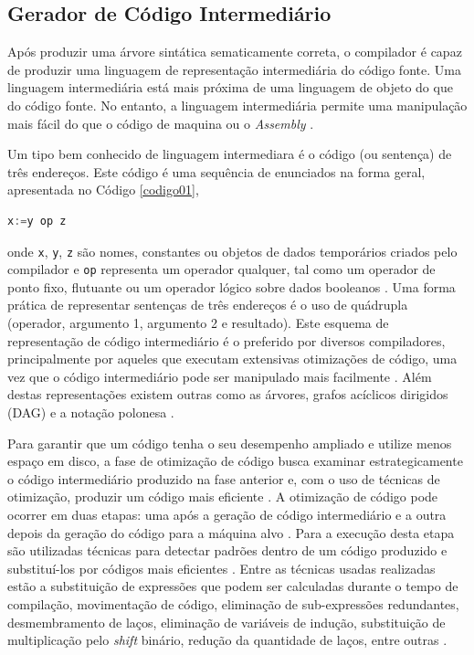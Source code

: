 \subsection{Gerador de Código Intermediário}

Após produzir uma árvore sintática sematicamente correta, o compilador é capaz de
 produzir uma linguagem de representação intermediária do código fonte. Uma linguagem 
intermediária está mais próxima de uma linguagem de objeto do que do código fonte. 
No entanto, a linguagem  intermediária permite uma manipulação mais fácil do que o 
código de maquina ou o \textit{Assembly} \cite{ref25}. 

Um tipo bem conhecido de linguagem intermediara é o código (ou sentença) de três 
endereços\cite{ref26}. Este código é uma sequência de enunciados na forma geral, apresentada 
 no Código \ref{codigo01},

\begin{lstlisting}[language=C++,caption={Código de três endereços},
											label=codigo01]
   x:=y op z
\end{lstlisting}
onde \texttt{x}, \texttt{y}, \texttt{z} são nomes, constantes ou objetos de dados 
temporários criados pelo compilador e \texttt{op} representa um operador qualquer,
 tal como um operador de ponto fixo, flutuante ou um operador lógico sobre dados
 booleanos \cite{ref27}. Uma forma prática de representar sentenças de três endereços é o uso
 de quádrupla (operador, argumento 1, argumento 2 e resultado). 
Este esquema de representação de código intermediário é o preferido por diversos
 compiladores, principalmente por aqueles que executam extensivas otimizações de
 código, uma vez que o código intermediário pode ser manipulado mais 
facilmente \cite{ref28}. Além destas representações existem outras como as 
árvores, grafos acíclicos dirigidos (DAG) e a notação polonesa \cite{ref29}.

Para garantir que um código tenha o seu desempenho ampliado e utilize menos 
espaço em disco, a fase de otimização de código busca examinar 
estrategicamente o código intermediário produzido na fase anterior e, com o 
uso de técnicas de otimização, produzir um código mais eficiente \cite{ref30}
. A otimização de código pode ocorrer em duas etapas: uma após a geração de 
código intermediário e a outra depois da geração do código para a máquina 
alvo \cite{ref31}. 
Para a execução desta etapa são utilizadas técnicas para detectar 
padrões dentro de um código produzido e substituí-los por códigos mais
 eficientes \cite{ref28}. Entre as técnicas usadas realizadas estão a 
substituição de expressões que podem ser calculadas durante o tempo 
de compilação, movimentação de código, eliminação de sub-expressões 
redundantes, desmembramento de laços, eliminação de variáveis de indução, 
substituição de multiplicação pelo \textit{shift} binário, redução da 
quantidade de laços, entre outras \cite{ref30}.

